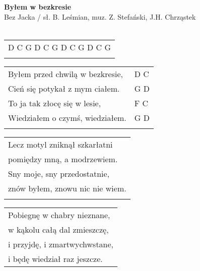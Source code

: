 \documentclass[a5paper]{article}
\begin{document}


\noindent
\fontsize{12pt}{15pt}\selectfont
\textbf{Byłem w bezkresie} \\
\fontsize{8pt}{10pt}\selectfont
Bez Jacka / sł. B. Leśmian, muz. Z. Stefański, J.H. Chrząstek \\ \\
\fontsize{10pt}{12pt}\selectfont
{}
\begin{tabular}{@{}p{9.5cm}@{}}
\noindent
D C G D C G D C G D C G \\ \\
\end{tabular}

\noindent
\begin{tabular}{@{}p{8.5cm}p{3cm}@{}}
Byłem przed chwilą w bezkresie, & D C \\
Cień się potykał z mym ciałem. & G D \\
To ja tak złocę się w lesie, & F C \\
Wiedziałem o czymś, wiedziałem. & G D \\ \\
\end{tabular}

\noindent
\begin{tabular}{@{}p{9.5cm}@{}}
Lecz motyl zniknął szkarłatni \\
pomiędzy mną, a modrzewiem. \\
Sny moje, sny przedostatnie, \\
znów byłem, znowu nic nie wiem. \\ \\
\end{tabular}

\noindent
\begin{tabular}{@{}p{9.5cm}@{}}
Pobiegnę w chabry nieznane, \\
w kąkolu całą dal zmieszczę, \\
i przyjdę, i zmartwychwstane, \\
i będę wiedział raz jeszcze.
\end{tabular}
\end{document}
